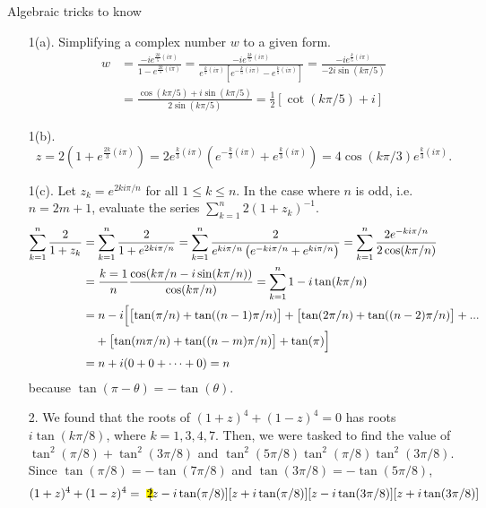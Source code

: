 \documentclass[oneside]{book}
\newcommand{\highlight}[2][red!50]{\mathpalette{\highlightwithstyle[#1]}{#2}}
\newcommand{\highlightwithstyle}[3][red!50]{
  \begingroup                         %
    \sbox0{$\mathsurround 0pt #2#3$}%
    \setlength{\fboxsep}{.5pt}        %
    \sbox2{\hspace{-.5pt}%
      \colorbox{#1}{\usebox0}%
    }%
    \dp2=\dp0 \ht2=\ht0 \wd2=\wd0     %
    \box2                             %
  \endgroup                           %
}
\begin{document}
\begin{example}{Algebraic tricks to know}{}
  \begin{enumerate}
    \item[1(a).] Simplifying a complex number \(w\) to a given form. 
    \begin{align*}
      w&=\frac{-ie^{\frac{2k}{5}(i\pi)}}{1-e^{\frac{2k}{5}(i\pi)}}=\frac{-ie^{\frac{2k}{5}(i\pi)}}{e^{\frac{k}{5}(i\pi)}\left[ e^{-\frac{k}{5}(i\pi)}-e^{\frac{k}{5}(i\pi)} \right]}=\frac{-ie^{\frac{k}{5}(i\pi)}}{-2i\sin(k\pi/5)}\\
      &=\frac{\cos(k\pi/5)+i\sin(k\pi/5)}{2\sin(k\pi/5)}=\frac{1}{2}[\cot(k\pi/5)+i]
    \end{align*}
    \item[1(b).]
    \[z=2\left( 1+e^{\frac{2k}{3}(i\pi)} \right)=2e^{\frac{k}{3}(i\pi)}\left( e^{-\frac{k}{3}(i\pi)}+e^{\frac{k}{3}(i\pi)} \right)=4\cos(k\pi/3)e^{\frac{k}{3}(i\pi)}.\]
    \item[1(c).] Let \(z_k=e^{2ki\pi/n}\) for all \(1\leq k\leq n\). In the case where \(n\) is odd, i.e. \(n=2m+1\), evaluate the series \(\sum_{k=1}^{n}{2(1+z_k)^{-1}}\).
    \begin{align*}
      \sum_{k=1}^{n}{\frac{2}{1+z_k}}&=\sum_{k=1}^{n}{\frac{2}{1+e^{2ki\pi/n}}}=\sum_{k=1}^{n}{\frac{2}{e^{ki\pi/n}\left( e^{-ki\pi/n}+e^{ki\pi/n} \right)}}=\sum_{k=1}^{n}{\frac{2e^{-ki\pi/n}}{2\cos(k\pi/n)}}\\
      &=\frac{k=1}{n}\frac{\cos(k\pi/n-i\sin(k\pi/n))}{\cos(k\pi/n)}=\sum_{k=1}^{n}{1-i\tan(k\pi/n)}\\
      &=n-i\Bigl[\bigl[\tan(\pi/n)+\tan((n-1)\pi/n)\bigr]+\bigl[\tan(2\pi/n)+\tan((n-2)\pi/n)\bigr]+...\\
      &\hphantom{={}}+\bigl[\tan(m\pi/n)+\tan((n-m)\pi/n)\bigr]+\tan(\pi)\Bigr]\\
      &=n+i(0+0+\dots+0)=n
    \end{align*}
    because \(\tan(\pi-\theta)=-\tan(\theta)\).
    \item[2.] We found that the roots of \((1+z)^4+(1-z)^4=0\) has roots \(i\tan(k\pi/8)\), where \(k=1,3,4,7\). Then, we were tasked to find the value of \(\tan^2(\pi/8)+\tan^2(3\pi/8)\) and \(\tan^2(5\pi/8)\tan^2(\pi/8)\tan^2(3\pi/8)\).\\[\baselineskip]
    Since \(\tan(\pi/8)=-\tan(7\pi/8)\) and \(\tan(3\pi/8)=-\tan(5\pi/8)\),
    \begin{align*}
      (1+z)^4+(1-z)^4 &= \highlight[yellow]{2}[z-i\tan(\pi/8)][z+i\tan(\pi/8)][z-i\tan(3\pi/8)][z+i\tan(3\pi/8)]\\

\end{align*}
\end{enumerate}
\end{example}
\end{document}
